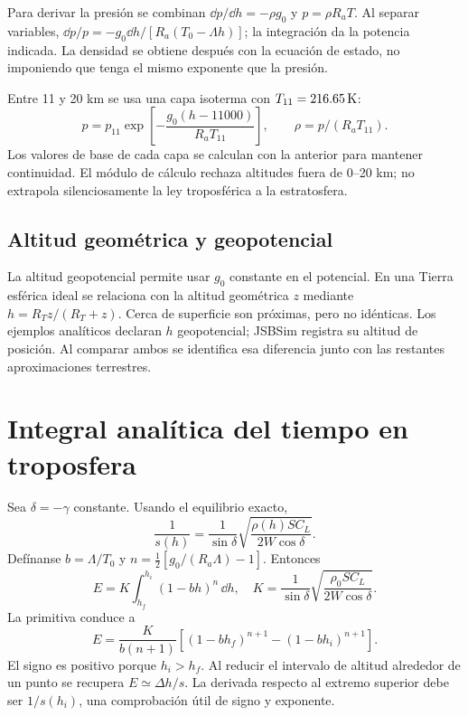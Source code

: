 Para derivar la presión se combinan $\dd p/\dd h=-\rho g_0$ y $p=\rho R_aT$. Al separar variables, $\dd p/p=-g_0\dd h/[R_a(T_0-\Lambda h)]$; la integración da la potencia indicada. La densidad se obtiene después con la ecuación de estado, no imponiendo que tenga el mismo exponente que la presión.

Entre 11 y 20 km se usa una capa isoterma con $T_{11}=216.65\,\mathrm{K}$:
\begin{equation}
p=p_{11}\exp\!\left[-\frac{g_0(h-11000)}{R_aT_{11}}\right],\qquad
\rho=p/(R_aT_{11}).
\end{equation}
Los valores de base de cada capa se calculan con la anterior para mantener continuidad. El módulo de cálculo rechaza altitudes fuera de 0--20 km; no extrapola silenciosamente la ley troposférica a la estratosfera.


\subsection{Altitud geométrica y geopotencial}
La altitud geopotencial permite usar $g_0$ constante en el potencial. En una Tierra esférica ideal se relaciona con la altitud geométrica $z$ mediante $h=R_Tz/(R_T+z)$. Cerca de superficie son próximas, pero no idénticas. Los ejemplos analíticos declaran $h$ geopotencial; JSBSim registra su altitud de posición. Al comparar ambos se identifica esa diferencia junto con las restantes aproximaciones terrestres.

\section{Integral analítica del tiempo en troposfera}
Sea $\delta=-\gamma$ constante. Usando el equilibrio exacto,
\begin{equation}
\frac1{s(h)}=
\frac1{\sin\delta}\sqrt{\frac{\rho(h)SC_L}{2W\cos\delta}}.
\end{equation}
Defínanse $b=\Lambda/T_0$ y $n=\tfrac12[g_0/(R_a\Lambda)-1]$. Entonces
\begin{equation}
E=K\int_{h_f}^{h_i}(1-bh)^n\,\dd h,
\quad K=\frac1{\sin\delta}\sqrt{\frac{\rho_0SC_L}{2W\cos\delta}}.
\end{equation}
La primitiva conduce a
\begin{equation}
E=\frac{K}{b(n+1)}
\left[(1-bh_f)^{n+1}-(1-bh_i)^{n+1}\right].
\label{eq:glider-ISA-integral}
\end{equation}
El signo es positivo porque $h_i>h_f$. Al reducir el intervalo de altitud alrededor de un punto se recupera $E\simeq\Delta h/s$. La derivada respecto al extremo superior debe ser $1/s(h_i)$, una comprobación útil de signo y exponente.

